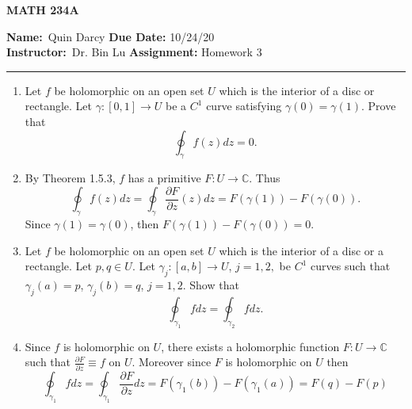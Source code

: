 \documentclass[12pt]{article}
\makeatletter
\theoremstyle{definition}
\theoremstyle{remark}
\renewenvironment{proof}[1][\proofname]{\par
  \pushQED{\qed}%
  \normalfont \topsep6\p@\@plus6\p@\relax
  \list{}{\leftmargin=0mm
          \rightmargin=4mm
          \settowidth{\itemindent}{\itshape#1}%
          \labelwidth=\itemindent
          \parsep=0pt \listparindent=\parindent 
  }
  \item[\hskip\labelsep
        \itshape
    #1\@addpunct{.}]\ignorespaces
}{%
  \popQED\endlist\@endpefalse
}
\let\oldproofname=\proofname
\renewcommand{\proofname}{\bf{\textit{\oldproofname}}}
\makeatother
\begin{document}
\thispagestyle{empty}\hline

\begin{center}
	\vspace{.4cm} {\textbf { \large MATH 234A}}
\end{center}
{\textbf{Name:}\ Quin Darcy \hspace{\fill} \textbf{Due Date:} 10/24/20   \\
{ \textbf{Instructor:}}\ Dr. Bin Lu \hspace{\fill} \textbf{Assignment:} Homework 3 \\ \hrule}

\justifying
    \begin{enumerate}[leftmargin=*]
        \item Let $f$ be holomorphic on an open set $U$ which is the interior of a disc or rectangle. Let $\gamma\colon[0,1]\rightarrow U$ be a $C^1$ curve satisfying $\gamma(0)=\gamma(1)$. Prove that 
            \begin{equation*}
                \oint_{\gamma}f(z)dz = 0.
            \end{equation*}
            \begin{proof}
                By Theorem 1.5.3, $f$ has a primitive $F\colon U\rightarrow\mathbb{C}$. Thus 
                    \begin{equation*}
                        \oint_{\gamma}f(z)dz=\oint_{\gamma}\frac{\partial F}{\partial z}(z)dz=F(\gamma(1))-F(\gamma(0)).
                    \end{equation*}
                Since $\gamma(1)=\gamma(0)$, then $F(\gamma(1))-F(\gamma(0))=0$.
            \end{proof}
        \item Let $f$ be holomorphic on an open set $U$ which is the interior of a disc or a rectangle. Let $p,q\in U$. Let $\gamma_j\colon[a,b]\rightarrow U$, $j=1,2,$ be $C^1$ curves such that $\gamma_j(a)=p$, $\gamma_j(b)=q$, $j=1,2$. Show that 
            \begin{equation*}
                \oint_{\gamma_1}fdz=\oint_{\gamma_2}fdz.
            \end{equation*}
            \begin{proof}
                Since $f$ is holomorphic on $U$, there exists a holomorphic function $F\colon U\rightarrow\mathbb{C}$ such that $\frac{\partial F}{\partial z}\equiv f$ on $U$. Moreover since $F$ is holomorphic on $U$ then 
                    \begin{equation*}
                        \oint_{\gamma_1}fdz=\oint_{\gamma_1}\frac{\partial F}{\partial z}dz =F(\gamma_1(b))-F(\gamma_1(a))=F(q)-F(p)

\end{equation*}
\end{proof}
\end{enumerate}
\end{document}
